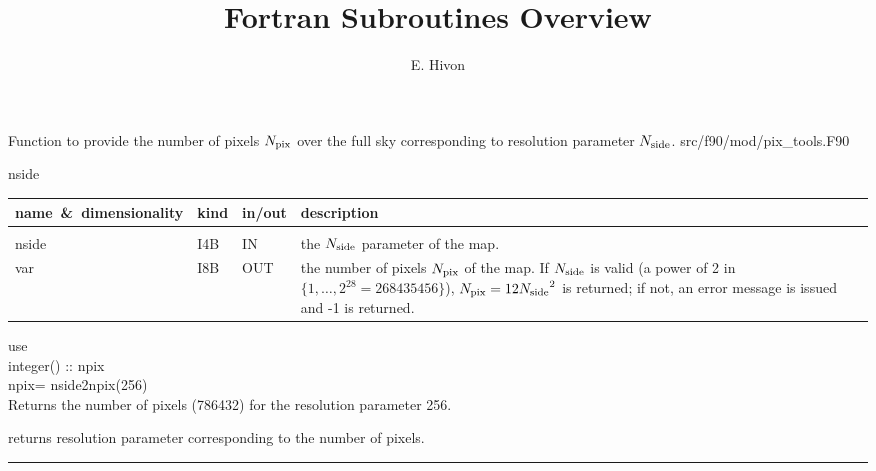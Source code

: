 
\sloppy


\title{\healpix Fortran Subroutines Overview}
 \section[nside2npix]{ }
\label{sub:nside2npix}
\author{E. Hivon}

\begin{facility}
{Function to provide the number of pixels ${N_{\rm pix}}$ over the full sky corresponding
to resolution parameter ${N_{\rm side}}$. 
}
{src/f90/mod/pix\_tools.F90}
\end{facility}

\begin{f90function}
{nside}
\end{f90function}

\begin{arguments}
{
\begin{tabular}{p{0.3\hsize} p{0.05\hsize} p{0.1\hsize} p{0.45\hsize}} \hline  
\textbf{name~\&~dimensionality} & \textbf{kind} & \textbf{in/out} & \textbf{description} \\ \hline
                   &   &   &                           \\ %
nside & I4B & IN & the ${N_{\rm side}}$ parameter of the map. \\
var & I8B & OUT & the number of pixels ${N_{\rm pix}}$ of the map. If ${N_{\rm side}}$ is valid (a power of 2 in
$\{1,\ldots,2^{28}=268435456\}$), ${N_{\rm pix}}=12{N_{\rm side}}^2$ is returned; if not, an error message is
issued and -1 is returned.\\
\end{tabular}
}
\end{arguments}

\begin{example}
{
use  \\
integer() :: npix \\
npix= nside2npix(256)  \\
}
{
Returns the number of \healpix pixels (786432) for the resolution
parameter 256.
}
\end{example}
\begin{related}
  \begin{sulist}{} %
  \item[\htmlref{npix2nside}{sub:npix2nside}] returns resolution parameter corresponding to the number of pixels.
  \end{sulist}
\end{related}

\rule{\hsize}{2mm}

